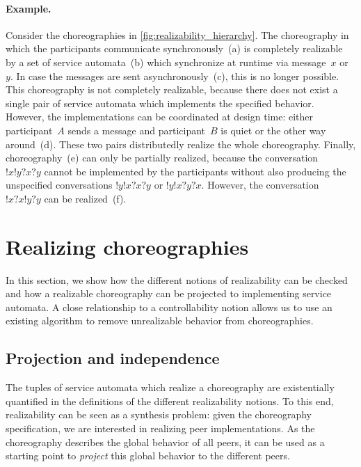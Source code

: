 \paragraph{Example.}

Consider the choreographies in \autoref{fig:realizability_hierarchy}.
The choreography in which the participants communicate synchronously~(a) is completely realizable by a set of service automata~(b) which synchronize at runtime via message~$x$ or $y$. In case the messages are sent asynchronously~(c), this is no longer possible. This choreography is not completely realizable, because there does not exist a single pair of service automata which implements the specified behavior. However, the implementations can be coordinated at design time: either participant~$A$ sends a message and participant~$B$ is quiet or the other way around~(d). These two pairs distributedly realize the whole choreography. Finally, choreography~(e) can only be partially realized, because the conversation ${!x!y?x?y}$ cannot be implemented by the participants without also producing the unspecified conversations ${!y!x?x?y}$ or ${!y!x?y?x}$. However, the conversation ${!x?x!y?y}$ can be realized~(f).





\section{Realizing choreographies}
\label{sect:realizing_choreographies}

In this section, we show how the different notions of realizability can be checked and how a realizable choreography can be projected to implementing service automata. A close relationship to a controllability notion allows us to use an existing algorithm to remove unrealizable behavior from choreographies.




\subsection*{Projection and independence}

The tuples of service automata which realize a choreography are existentially quantified in the definitions of the different realizability notions. To this end, realizability can be seen as a synthesis problem: given the choreography specification, we are interested in realizing peer implementations. As the choreography describes the global behavior of all peers, it can be used as a starting point to \emph{project} this global behavior to the different peers.

